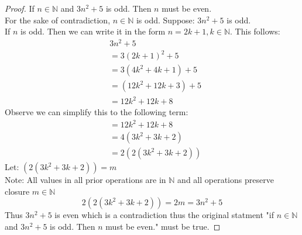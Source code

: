 \documentclass[11pt]{article}
\theoremstyle{plain}
\begin{document}
\begin{proof} If $n \in \mathbb{N}$ and $3n^2+5$ is odd. Then $n$ must be even. \\
	For the sake of contradiction, $n \in \mathbb{N}$ is odd. Suppose: $3n^2+5$ is odd. \\
	If $n$ is odd. Then we can write it in the form $n=2k+1, k \in \mathbb{N}$. This follows: \\
	\begin{align*}
		 & 3n^2+5            \\
		 & = 3(2k+1)^2+5     \\
		 & = 3(4k^2+4k+1)+5  \\
		 & = (12k^2+12k+3)+5 \\
		 & = 12k^2+12k+8
	\end{align*}
	Observe we can simplify this to the following term:
	\begin{align*}
		 & = 12k^2+12k+8     \\
		 & = 4(3k^2+3k+2)    \\
		 & = 2(2(3k^2+3k+2))
	\end{align*}
	Let: $(2(3k^2+3k+2)) = m$ \\
	Note: All values in all prior operations are in $\mathbb{N}$ and all operations preserve closure $m \in \mathbb{N}$
	\[
		2(2(3k^2+3k+2)) = 2m = 3n^2+5
	\]
	Thus $3n^2+5$ is even which is a contradiction thus the original statment "if $n \in \mathbb{N}$ and $3n^2+5$ is odd. Then $n$ must be even." must be true.
\end{proof}
\end{document}
